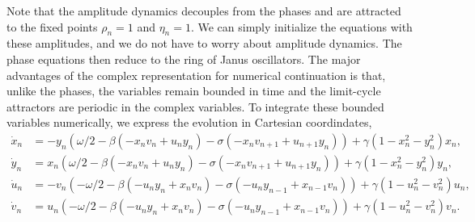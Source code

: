 \documentclass[aps,pre,amsmath,amssymb,floatfix,onecolumn,notitlepage,10pt]{revtex4-1}
\begin{document}
Note that the amplitude dynamics decouples from the phases and are attracted to the fixed points $\rho_n=1$ and $\eta_n=1$.  We can simply initialize the equations with these amplitudes, and we do not have to worry about amplitude dynamics.  The phase equations then reduce to the ring of Janus oscillators. The major advantages of the complex representation for numerical continuation is that, unlike the phases, the variables remain bounded in time and the limit-cycle attractors are periodic in the complex variables.  To integrate these bounded variables numerically, we express the evolution in Cartesian coordindates,
\begin{align}
\dot x_n &= -y_n\left(\omega/2 - \beta \left(-x_nv_n+u_ny_n \right) - \sigma\left(-x_nv_{n+1}+u_{n+1}y_n\right) \right) + \gamma\left(1-x_n^2-y_n^2\right)x_n, \\
\dot y_n &= x_n\left(\omega/2 - \beta \left(-x_nv_n+u_ny_n \right) - \sigma\left(-x_nv_{n+1}+u_{n+1}y_n\right) \right) + \gamma\left(1-x_n^2-y_n^2\right)y_n, \\
\dot u_n &= -v_n\left(-\omega/2 - \beta \left(-u_ny_n+x_nv_n \right) - \sigma\left(-u_ny_{n-1}+x_{n-1}v_n\right) \right) + \gamma\left(1-u_n^2-v_n^2\right)u_n, \\
\dot v_n &= u_n\left(-\omega/2 - \beta \left(-u_ny_n+x_nv_n \right) - \sigma\left(-u_ny_{n-1}+x_{n-1}v_n\right) \right) + \gamma\left(1-u_n^2-v_n^2\right)v_n.
\end{align}
\end{document}
